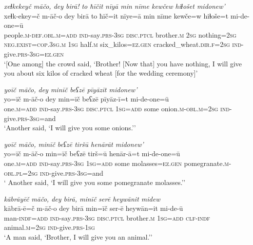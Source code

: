 \ea \label{ZP.118}
\textit{xeɫkekeyč māčo, dey birā! to ħīčit nīyā min nīme kewčew hiɫošet midonew’} \\ 
\gll xeɫk-ekey=č m-āč-o dey birā to ħīč=it nīye=ā min nīme kewče=w hiɫoše=t mi-de-one=ū \\ 
 people\textsc{.m}\textsc{-def}\textsc{.obl}\textsc{.m}\textsc{=add} \textsc{ind-}say\textsc{.prs}\textsc{-3sg} \textsc{disc.ptcl} brother\textsc{.m} \textsc{2sg} nothing\textsc{=\textsc{2sg}} \textsc{\textsc{neg.}exist}\textsc{=cop}\textsc{.3sg}\textsc{.m} \textsc{1sg} half\textsc{.m} six\_kilos\textsc{\textsc{=ez.gen}} cracked\_wheat\textsc{.dir}\textsc{.f}\textsc{=\textsc{2sg}} \textsc{ind-}give\textsc{.prs}\textsc{-3sg}\textsc{\textsc{=ez.gen}} \\ 
\glt `[One among] the crowd said, ‘Brother! [Now that] you have nothing, I will give you about six kilos of cracked wheat [for the wedding ceremony]'
\z 
 
\ea \label{ZP.119}
\textit{yoīč māčo, dey minīč beʕzē pīyāzīt midonew’} \\ 
\gll yo=īč m-āč-o dey min=īč beʕzē pīyāz-ī=t mi-de-one=ū \\ 
 one\textsc{.m}\textsc{=add} \textsc{ind-}say\textsc{.prs}\textsc{-3sg} \textsc{disc.ptcl} \textsc{1sg}\textsc{=add} some onion\textsc{.m}\textsc{-obl}\textsc{.m}\textsc{=\textsc{2sg}} \textsc{ind-}give\textsc{.prs}\textsc{-3sg}=and \\ 
\glt `Another said, ‘I will give you some onions.’'
\z 
 
\ea \label{ZP.120}
\textit{yoīč māčo, minīč beʕzē tiršū henārāt midonew’} \\ 
\gll yo=īč m-āč-o min=īč beʕzē tirš=ū henār-ā=t mi-de-one=ū \\ 
 one\textsc{.m}\textsc{=add} \textsc{ind-}say\textsc{.prs}\textsc{-3sg} \textsc{1sg}\textsc{=add} some molasses\textsc{\textsc{=ez.gen}} pomegranate\textsc{.m}\textsc{-obl}\textsc{.pl}\textsc{=\textsc{2sg}} \textsc{ind-}give\textsc{.prs}\textsc{-3sg}=and \\ 
\glt ` Another said, ‘I will give you some pomegranate molasses.’'
\z 
 
\ea \label{ZP.121}
\textit{kābrāyēč māčo, dey birā, minīč serē heywānit midew} \\ 
\gll kābrā-ē=č m-āč-o dey birā min=īč ser-ē heywān=it mi-de-ū \\ 
 man\textsc{-indf}\textsc{=add} \textsc{ind-}say\textsc{.prs}\textsc{-3sg} \textsc{disc.ptcl} brother\textsc{.m} \textsc{1sg}\textsc{=add} \textsc{clf}\textsc{-indf} animal\textsc{.m}\textsc{=\textsc{2sg}} \textsc{ind-}give\textsc{.prs}\textsc{-\textsc{1sg}} \\ 
\glt `A man said, ‘Brother, I will give you an animal.’'
\z 
 
